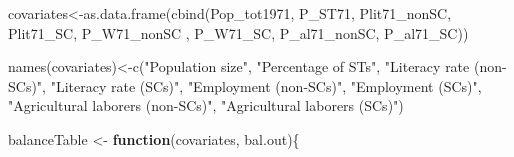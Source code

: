 \documentclass[
]{article}
\newenvironment{Shaded}{\begin{snugshade}}{\end{snugshade}}
\newcommand{\ControlFlowTok}[1]{\textcolor[rgb]{0.13,0.29,0.53}{\textbf{#1}}}
\newcommand{\FunctionTok}[1]{\textcolor[rgb]{0.00,0.00,0.00}{#1}}
\newcommand{\NormalTok}[1]{#1}
\newcommand{\OtherTok}[1]{\textcolor[rgb]{0.56,0.35,0.01}{#1}}
\newcommand{\StringTok}[1]{\textcolor[rgb]{0.31,0.60,0.02}{#1}}
\begin{document}
\begin{Shaded}
\begin{Highlighting}[]
\NormalTok{covariates}\OtherTok{\textless{}{-}}\FunctionTok{as.data.frame}\NormalTok{(}\FunctionTok{cbind}\NormalTok{(Pop\_tot1971, P\_ST71, Plit71\_nonSC, Plit71\_SC, P\_W71\_nonSC , P\_W71\_SC, P\_al71\_nonSC, P\_al71\_SC))}

\FunctionTok{names}\NormalTok{(covariates)}\OtherTok{\textless{}{-}}\FunctionTok{c}\NormalTok{(}\StringTok{"Population size"}\NormalTok{, }\StringTok{"Percentage of STs"}\NormalTok{, }\StringTok{"Literacy rate (non{-}SCs)"}\NormalTok{, }\StringTok{"Literacy rate (SCs)"}\NormalTok{, }\StringTok{"Employment (non{-}SCs)"}\NormalTok{, }\StringTok{"Employment (SCs)"}\NormalTok{, }\StringTok{"Agricultural laborers (non{-}SCs)"}\NormalTok{, }\StringTok{"Agricultural laborers (SCs)"}\NormalTok{)}

\NormalTok{balanceTable }\OtherTok{\textless{}{-}} \ControlFlowTok{function}\NormalTok{(covariates, bal.out)\{}


\end{Highlighting}
\end{Shaded}
\end{document}
